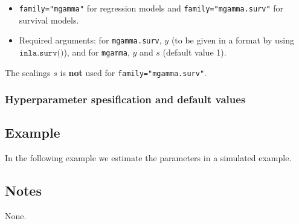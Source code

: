 \documentclass[a4paper,11pt]{article}
\begin{document}
\begin{itemize}
\item \texttt{family="mgamma"} for regression models and
    \texttt{family="mgamma.surv"} for survival models.
\item Required arguments: for \texttt{mgamma.surv}, $y$ (to be given in
    a format by using $\texttt{inla.surv()}$), and for \texttt{mgamma},
    $y$ and $s$ (default value 1).
\end{itemize}
The scalings $s$ is \textbf{not} used for \texttt{family="mgamma.surv"}.

\subsubsection*{Hyperparameter spesification and default values}




\subsection*{Example}

In the following example we estimate the parameters in a simulated
example.


\subsection*{Notes}

None.
\end{document}
